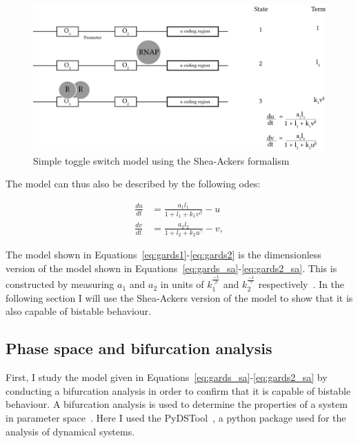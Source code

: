 \begin{figure}[tb]
\centerfloat
\includegraphics[scale=0.7]{../../chapters/chapterABCSysBio/images/shea-ackers-cs.png}
\caption[Simple toggle switch model using the Shea-Ackers formalism]{\label{fig:sa-GCS}Simple toggle switch model using the Shea-Ackers formalism}
\end{figure}


The model can thus also be described by the following \acrshort{ode}s:

\begin{align}\label{eq:gards_sa}
\frac{du}{dt} &= \frac{a_1  l_1}{1 + l_1 + k_1  v^{\beta}} - u \\\label{eq:gards2_sa}
\frac{dv}{dt} &= \frac{a_2  l_2}{1 + l_2 + k_2  u^{\gamma }} - v,
\end{align}

The model shown in Equations~\ref{eq:gards1}-\ref{eq:gards2} is the dimensionless version of the model shown in Equations~\ref{eq:gards_sa}-\ref{eq:gards2_sa}. This is constructed by measuring $a_1$ and $a_2$ in units of $k_{1}^{\frac{-1}{β}}$ and $k_{2}^{\frac{-1}{γ}}$ respectively~\autocite{phys_biol_cell}. In the following section I will use the Shea-Ackers version of the model to show that it is also capable of bistable behaviour. 

\subsection{Phase space and bifurcation analysis}
\label{sec:bifurc}


First, I study the model given in Equations~\ref{eq:gards_sa}-\ref{eq:gards2_sa} by conducting a bifurcation analysis in order to confirm that it is capable of bistable behaviour. A bifurcation analysis is used to determine the properties of a system in parameter space~\autocite{Alon:2007}. Here I used the PyDSTool~\autocite{Clewley:2012kj}, a python package used for the analysis of dynamical systems. 


